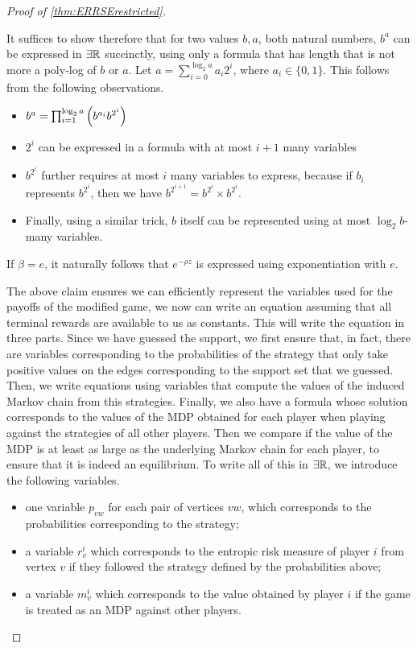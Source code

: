 \begin{proof}[Proof of \cref{thm:ERRSErestricted}]
\begin{claimproof}
        It suffices to show therefore that for two values $b,a$, both natural numbers, $b^a$ can be expressed in $\exists\mathbb{R}$ succinctly, using only a formula that has length that is not more a poly-log of $b$ or $a$. 
        Let $a = \sum_{i=0}^{\log_2{a}}a_i 2^i$, where $a_i\in\{0,1\}$. 
        This follows from the following observations. 
        \begin{itemize}
            \item $b^a = \prod_{i=1}^{\log_2{a}}\left( b^{a_i}b^{2^i} \right)$
            \item  $2^i$ can be expressed in a formula with at most $i+1$ many variables
            \item $b^{2^i}$ further requires at most $i$ many variables to express, because if $b_i$ represents $b^{2^{i}}$, then we have $b^{2^{i+1}} = b^{2^i}\times b^{2^i}$.
            \item Finally, using a similar trick, $b$ itself can be represented using at most $\log_2{b}$-many variables. 
        \end{itemize}
        If $\beta = e$, it naturally follows that $e^{-\rho z}$ is expressed using exponentiation with $e$. 
\end{claimproof}

    The above claim ensures we can efficiently represent the variables used for the payoffs of the modified game, we now can write an equation assuming that all terminal rewards are available to us as constants. 
    This will write the equation in three parts. Since we have guessed the support, we first ensure that, in fact, there are variables corresponding to the probabilities of the strategy that only take positive values on the edges corresponding to the support set that we guessed.  
    Then, we write equations using variables that compute the values of the induced Markov chain from this strategies. Finally, we also have a formula whose solution corresponds to the values of the MDP obtained for each player when playing against the strategies of all other players. Then we compare if the value of the MDP is at least as large as the underlying Markov chain for each player, to ensure that it is indeed an equilibrium. To write all of this in $\exists\mathbb{R}$, we introduce the following variables. 
     \begin{itemize}
         \item one variable  $p_{vw}$ for each pair of vertices $vw$, which corresponds to the probabilities corresponding to the strategy;
         \item a variable $r^i_v$ which corresponds to the entropic risk measure of player $i$ from vertex $v$ if they followed the strategy defined by the probabilities above; 
         \item a variable $m^i_v$ which corresponds to the value obtained by player $i$ if the game is treated as an MDP against other players.
     \end{itemize}
 

\end{proof}
